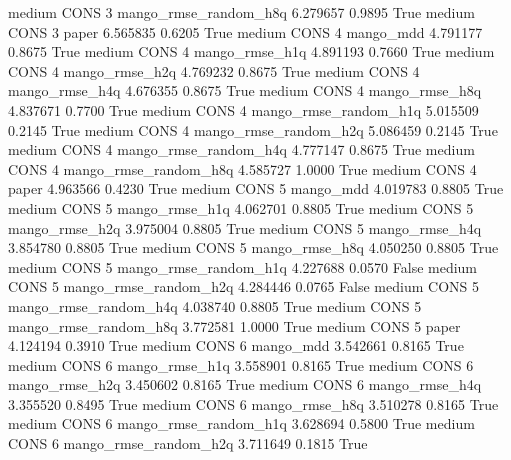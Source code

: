     medium     CONS                 3 mango_rmse_random_h8q   6.279657      0.9895    True
    medium     CONS                 3                 paper   6.565835      0.6205    True
    medium     CONS                 4             mango_mdd   4.791177      0.8675    True
    medium     CONS                 4        mango_rmse_h1q   4.891193      0.7660    True
    medium     CONS                 4        mango_rmse_h2q   4.769232      0.8675    True
    medium     CONS                 4        mango_rmse_h4q   4.676355      0.8675    True
    medium     CONS                 4        mango_rmse_h8q   4.837671      0.7700    True
    medium     CONS                 4 mango_rmse_random_h1q   5.015509      0.2145    True
    medium     CONS                 4 mango_rmse_random_h2q   5.086459      0.2145    True
    medium     CONS                 4 mango_rmse_random_h4q   4.777147      0.8675    True
    medium     CONS                 4 mango_rmse_random_h8q   4.585727      1.0000    True
    medium     CONS                 4                 paper   4.963566      0.4230    True
    medium     CONS                 5             mango_mdd   4.019783      0.8805    True
    medium     CONS                 5        mango_rmse_h1q   4.062701      0.8805    True
    medium     CONS                 5        mango_rmse_h2q   3.975004      0.8805    True
    medium     CONS                 5        mango_rmse_h4q   3.854780      0.8805    True
    medium     CONS                 5        mango_rmse_h8q   4.050250      0.8805    True
    medium     CONS                 5 mango_rmse_random_h1q   4.227688      0.0570   False
    medium     CONS                 5 mango_rmse_random_h2q   4.284446      0.0765   False
    medium     CONS                 5 mango_rmse_random_h4q   4.038740      0.8805    True
    medium     CONS                 5 mango_rmse_random_h8q   3.772581      1.0000    True
    medium     CONS                 5                 paper   4.124194      0.3910    True
    medium     CONS                 6             mango_mdd   3.542661      0.8165    True
    medium     CONS                 6        mango_rmse_h1q   3.558901      0.8165    True
    medium     CONS                 6        mango_rmse_h2q   3.450602      0.8165    True
    medium     CONS                 6        mango_rmse_h4q   3.355520      0.8495    True
    medium     CONS                 6        mango_rmse_h8q   3.510278      0.8165    True
    medium     CONS                 6 mango_rmse_random_h1q   3.628694      0.5800    True
    medium     CONS                 6 mango_rmse_random_h2q   3.711649      0.1815    True

